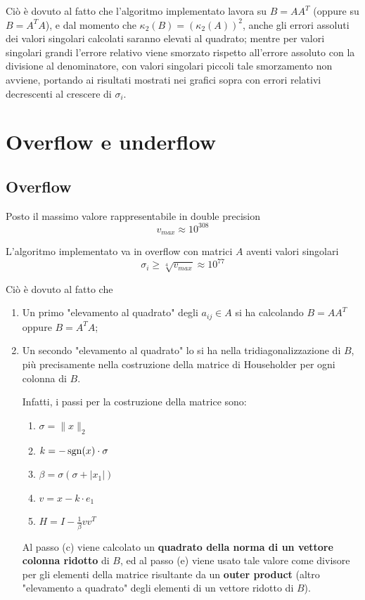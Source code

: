 Ciò è dovuto al fatto che l'algoritmo implementato lavora su $B = A A^T$ (oppure 
su $B = A^T A$), e dal momento che $\kappa_2(B) = (\kappa_2(A))^2$, anche gli 
errori assoluti dei valori singolari calcolati saranno elevati al quadrato; 
mentre per valori singolari grandi l'errore relativo viene smorzato rispetto 
all'errore assoluto con la divisione al denominatore, con valori singolari 
piccoli tale smorzamento non avviene, portando ai risultati mostrati nei grafici 
sopra con errori relativi decrescenti al crescere di $\sigma_i$.



\section{Overflow e underflow}
\subsection{Overflow}
Posto il massimo valore rappresentabile in double precision
\begin{equation*}
	v_{max} \approx 10^{308}
\end{equation*}

L'algoritmo implementato va in overflow con matrici $A$ aventi valori singolari
\begin{equation*}
	\sigma_i \geq \sqrt[4]{v_{max}} \approx 10^{77}
\end{equation*}

Ciò è dovuto al fatto che
\begin{enumerate}
	\item Un primo "elevamento al quadrato" degli $a_{ij} \in A$ si ha calcolando 
$B = A A^T$ oppure $B = A^T A$;
	\item Un secondo "elevamento al quadrato" lo si ha nella tridiagonalizzazione 
di $B$, più precisamente nella costruzione della matrice di Householder per ogni 
colonna di $B$.
	
	Infatti, i passi per la costruzione della matrice sono:
	\begin{enumerate}
		\item $\sigma = \| x \|_2$
		\item $k = -\operatorname{sgn}(x) \cdot \sigma$
		\item $\beta = \sigma (\sigma + | x_1 |)$
		\item $v = x - k \cdot e_1$
		\item $H = I - \frac{1}{\beta}v v^T $
	\end{enumerate}
	
Al passo (c) viene calcolato un \textbf{quadrato della norma di un vettore 
colonna ridotto} di $B$, ed al passo (e) viene usato tale valore come divisore 
per gli elementi della matrice risultante da un \textbf{outer product} (altro 
"elevamento a quadrato" degli elementi di un vettore ridotto di $B$).


\end{enumerate}


